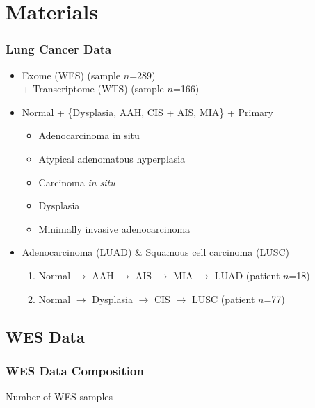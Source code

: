 \documentclass{beamer}
\begin{document}
    \section{Materials}
    \begin{frame}
        \frametitle{Lung Cancer Data}

        \begin{itemize}
            \item Exome (WES) (sample $n$=289) \\
                + Transcriptome (WTS) (sample $n$=166)
            \item Normal + \{Dysplasia, AAH, CIS + AIS, MIA\} + Primary
            \begin{itemize}
                \item Adenocarcinoma in situ
                \item Atypical adenomatous hyperplasia
                \item Carcinoma \textit{in situ}
                \item Dysplasia
                \item Minimally invasive adenocarcinoma
            \end{itemize}
            \item Adenocarcinoma (LUAD) \& Squamous cell carcinoma (LUSC)
            \begin{enumerate}
                \item Normal $\rightarrow$ AAH $\rightarrow$ AIS $\rightarrow$ MIA $\rightarrow$ LUAD (patient $n$=18)
                \item Normal $\rightarrow$ Dysplasia $\rightarrow$ CIS $\rightarrow$ LUSC (patient $n$=77)
            \end{enumerate}
        \end{itemize}
    \end{frame}

    \subsection{WES Data}
    \begin{frame}
        \frametitle{WES Data Composition}

        \begin{table}
            \caption{Number of WES samples}
            \resizebox{!}{0.3 \textheight}
            {}
        \end{table}
    \end{frame}
\end{document}
